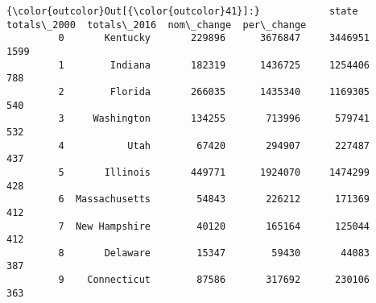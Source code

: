 \documentclass[11pt]{article}
\begin{document}
\begin{Verbatim}[commandchars=\\\{\}]
{\color{outcolor}Out[{\color{outcolor}41}]:}            state  totals\_2000  totals\_2016  nom\_change  per\_change
         0       Kentucky       229896      3676847     3446951        1599
         1        Indiana       182319      1436725     1254406         788
         2        Florida       266035      1435340     1169305         540
         3     Washington       134255       713996      579741         532
         4           Utah        67420       294907      227487         437
         5       Illinois       449771      1924070     1474299         428
         6  Massachusetts        54843       226212      171369         412
         7  New Hampshire        40120       165164      125044         412
         8       Delaware        15347        59430       44083         387
         9    Connecticut        87586       317692      230106         363
\end{Verbatim}
            
\end{document}
